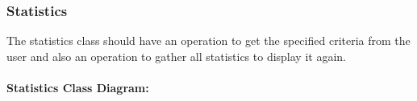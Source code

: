 \subsubsection{Statistics}
The statistics class should have an operation to get the specified criteria from the user and also an operation to gather all statistics to display it again.\\ \\ 
\textbf{Statistics Class Diagram:}\\
\centerline{}



